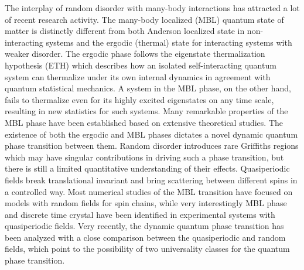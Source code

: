 \documentclass[prl,aps,epsf,showpacs,twocolumn,letterpaper]{revtex4}
\begin{document}
The interplay of random disorder with many-body interactions has attracted a lot of recent research activity\cite{basko2006, oganesyan2007, pal2010, znidaric2008, huse2013, nandkishore2015, altman2015, huse2014, nandkishore2014, pekker_hilbert2014}.  The many-body localized (MBL) quantum state\cite{nandkishore2015, altman2015, huse2014, nandkishore2014, pekker_hilbert2014} of matter is distinctly different from both Anderson localized state  in non-interacting systems and the ergodic (thermal) state for interacting systems with weaker disorder.  The ergodic phase follows the  eigenstate thermalization hypothesis (ETH) which describes how an isolated self-interacting quantum system can thermalize under its own internal dynamics in agreement with quantum statistical mechanics\cite{deutsch1991, srednicki1994, rigol2008}.  A system in the MBL phase, on the other hand, fails to thermalize even for its highly excited eigenstates on any time scale, resulting in new statistics for such systems\cite{basko2006, oganesyan2007, pal2010, znidaric2008, huse2013, nandkishore2015, altman2015, huse2014, nandkishore2014, pekker_hilbert2014}.  Many remarkable properties of the MBL phase have been established\cite{nandkishore2015, altman2015, huse2013, nandkishore2014, oganesyan2007, pal2010, znidaric2008, rigol2008, serbyn2014, kwasigroch2014, yao2014, vasseur2015, huse2014, serbyn2013, ros2015, chandran2014, grover2014, agarwal2015, knap2015, luitz2015, devakul2015, torres2015, canovi2011, cuevas2012, bauer2013, kjall2014, luca2013, iyer2013, pekker_hilbert2014, johri2014, bardarson2012, andraschko2014, laumann2014, hickey2014, nanduri2014, barlev2014, imbrie2014, groverf2014, ponte2015, huang2015, you2015, serbyn2015, singh2015, barlev2015, deng2015, chen2015} based on extensive theoretical studies.  The existence of both the ergodic and MBL phases dictates  a novel dynamic quantum phase transition between them\cite{basko2006, pal2010, oganesyan2007, kjall2014, vosk_theory2014, potter2015trans, serbyn2015, agarwal2015, knap2015, lim2016, zhang2016, zhang2016a, yu2016, vedika2016, dumitrescu2017}.  Random disorder introduces rare Griffiths regions\cite{vosk_theory2014, potter2015trans, knap2015,luitz2015,lim2016} which may have singular contributions in driving such a phase transition, but there is still a limited quantitative understanding of their effects. Quasiperiodic fields break translational invariant and bring scattering between different spins in a controlled way.   Most numerical studies of the MBL transition have focused on models with random fields  for spin chains\cite{pal2010, kjall2014, luitz2015, yu2016, vedika2016}, while very interestingly  MBL phase and discrete time crystal have been identified in experimental systems with quasiperiodic fields\cite{serbyn2014,kwasigroch2014,yao2014,vasseur2015, bordia2015}.
Very recently,   the dynamic quantum phase transition has been analyzed with a close comparison between the quasiperiodic and random  fields, which point to the possibility of two universality classes for the quantum phase transition\cite{vedika2017, vedika2016}.
\end{document}
